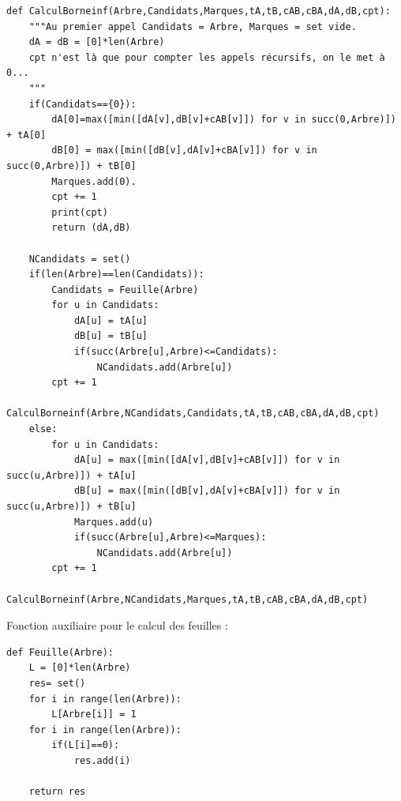 \documentclass{article}
\begin{document}
\begin{lstlisting}
def CalculBorneinf(Arbre,Candidats,Marques,tA,tB,cAB,cBA,dA,dB,cpt):
    """Au premier appel Candidats = Arbre, Marques = set vide.
    dA = dB = [0]*len(Arbre)
    cpt n'est là que pour compter les appels récursifs, on le met à 0...
    """
    if(Candidats=={0}): 
        dA[0]=max([min([dA[v],dB[v]+cAB[v]]) for v in succ(0,Arbre)]) + tA[0]
        dB[0] = max([min([dB[v],dA[v]+cBA[v]]) for v in succ(0,Arbre)]) + tB[0]
        Marques.add(0).
        cpt += 1
        print(cpt)
        return (dA,dB) 
        
    NCandidats = set()
    if(len(Arbre)==len(Candidats)): 
        Candidats = Feuille(Arbre) 
        for u in Candidats:
            dA[u] = tA[u]
            dB[u] = tB[u]
            if(succ(Arbre[u],Arbre)<=Candidats): 
                NCandidats.add(Arbre[u])
        cpt += 1
        CalculBorneinf(Arbre,NCandidats,Candidats,tA,tB,cAB,cBA,dA,dB,cpt) 
    else: 
        for u in Candidats:
            dA[u] = max([min([dA[v],dB[v]+cAB[v]]) for v in succ(u,Arbre)]) + tA[u]
            dB[u] = max([min([dB[v],dA[v]+cBA[v]]) for v in succ(u,Arbre)]) + tB[u]
            Marques.add(u)          
            if(succ(Arbre[u],Arbre)<=Marques):
                NCandidats.add(Arbre[u])
        cpt += 1
        CalculBorneinf(Arbre,NCandidats,Marques,tA,tB,cAB,cBA,dA,dB,cpt)
\end{lstlisting}

Fonction auxiliaire pour le calcul des feuilles :
\begin{lstlisting}
def Feuille(Arbre):
    L = [0]*len(Arbre)
    res= set()
    for i in range(len(Arbre)):
        L[Arbre[i]] = 1           
    for i in range(len(Arbre)):
        if(L[i]==0):
            res.add(i)
            
    return res
\end{lstlisting}
\end{document}
